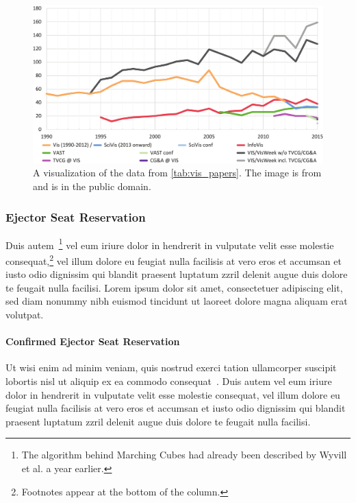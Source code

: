 \documentclass[journal]{vgtc}                %
\begin{document}
\begin{figure}[tb]
 \centering %
 \includegraphics[width=\columnwidth]{paper-count-w-2015-new}
 \caption{A visualization of the data from \autoref{tab:vis_papers}. The image is from \cite{Isenberg:2017:VMC} and is in the public domain.}
 \label{fig:sample}
\end{figure}

\subsubsection{Ejector Seat Reservation}

Duis autem~\cite{Lorensen:1987:MCA}\footnote{The algorithm behind
Marching Cubes \cite{Lorensen:1987:MCA} had already been
described by Wyvill et al. \cite{Wyvill:1986:DSS} a year
earlier.} vel eum iriure dolor in hendrerit
in vulputate velit esse molestie consequat,\footnote{Footnotes
appear at the bottom of the column.} vel illum dolore eu
feugiat nulla facilisis at vero eros et accumsan et iusto odio
dignissim qui blandit praesent luptatum zzril delenit augue duis
dolore te feugait nulla facilisi. Lorem ipsum dolor sit amet,
consectetuer adipiscing elit, sed diam nonummy nibh euismod tincidunt
ut laoreet dolore magna aliquam erat volutpat.


\paragraph{Confirmed Ejector Seat Reservation}

Ut wisi enim ad minim veniam, quis nostrud exerci tation ullamcorper
suscipit lobortis nisl ut aliquip ex ea commodo
consequat~\cite{Nielson:1991:TAD}. Duis autem vel eum iriure dolor in
hendrerit in vulputate velit esse molestie consequat, vel illum dolore
eu feugiat nulla facilisis at vero eros et accumsan et iusto odio
dignissim qui blandit praesent luptatum zzril delenit augue duis
dolore te feugait nulla facilisi.
\end{document}
